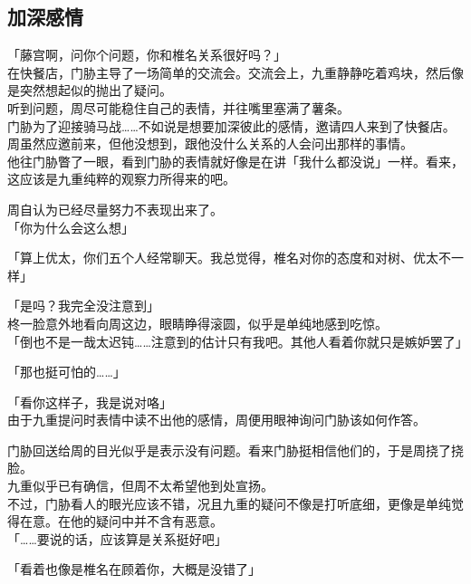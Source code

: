 \subsection{加深感情}

「藤宫啊，问你个问题，你和椎名关系很好吗？」\\

在快餐店，门胁主导了一场简单的交流会。交流会上，九重静静吃着鸡块，然后像是突然想起似的抛出了疑问。\\

听到问题，周尽可能稳住自己的表情，并往嘴里塞满了薯条。\\

门胁为了迎接骑马战……不如说是想要加深彼此的感情，邀请四人来到了快餐店。周虽然应邀前来，但他没想到，跟他没什么关系的人会问出那样的事情。\\

他往门胁瞥了一眼，看到门胁的表情就好像是在讲「我什么都没说」一样。看来，这应该是九重纯粹的观察力所得来的吧。

周自认为已经尽量努力不表现出来了。\\

「你为什么会这么想」

「算上优太，你们五个人经常聊天。我总觉得，椎名对你的态度和对树、优太不一样」

「是吗？我完全没注意到」\\

柊一脸意外地看向周这边，眼睛睁得滚圆，似乎是单纯地感到吃惊。\\

「倒也不是一哉太迟钝……注意到的估计只有我吧。其他人看着你就只是嫉妒罢了」

「那也挺可怕的……」

「看你这样子，我是说对咯」\\

由于九重提问时表情中读不出他的感情，周便用眼神询问门胁该如何作答。

门胁回送给周的目光似乎是表示没有问题。看来门胁挺相信他们的，于是周挠了挠脸。\\

九重似乎已有确信，但周不太希望他到处宣扬。\\

不过，门胁看人的眼光应该不错，况且九重的疑问不像是打听底细，更像是单纯觉得在意。在他的疑问中并不含有恶意。\\

「……要说的话，应该算是关系挺好吧」

「看着也像是椎名在顾着你，大概是没错了」

